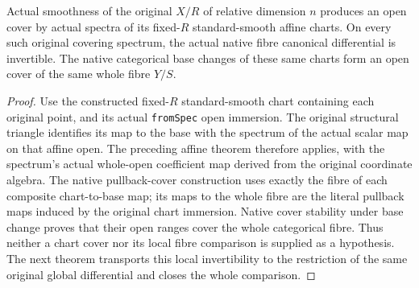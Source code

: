 \begin{lemma}
\label{lem:kn-arithmetic-global-fibre-chart-cover}
\leanok
{}
Actual smoothness of the original $X/R$ of relative dimension $n$ produces an
open cover by actual spectra of its fixed-$R$ standard-smooth affine charts.
On every such original covering spectrum, the actual native fibre canonical
differential is invertible.  The native categorical base changes of these
same charts form an open cover of the same whole fibre $Y/S$.
\end{lemma}
\begin{proof}
Use the constructed fixed-$R$ standard-smooth chart containing each original
point, and its actual \texttt{fromSpec} open immersion.  The original
structural triangle identifies its map to the base with the spectrum of the
actual scalar map on that affine open.  The preceding affine theorem
therefore applies, with the spectrum's actual whole-open coefficient map
derived from the original coordinate algebra.  The native pullback-cover
construction uses exactly the fibre of each composite chart-to-base map;
its maps to the whole fibre are the literal pullback maps induced by the
original chart immersion.  Native cover stability under base change proves
that their open ranges cover the whole categorical fibre.  Thus neither a
chart cover nor its local fibre comparison is supplied as a hypothesis.
The next theorem transports this local invertibility to the restriction of
the same original global differential and closes the whole comparison.
\end{proof}

